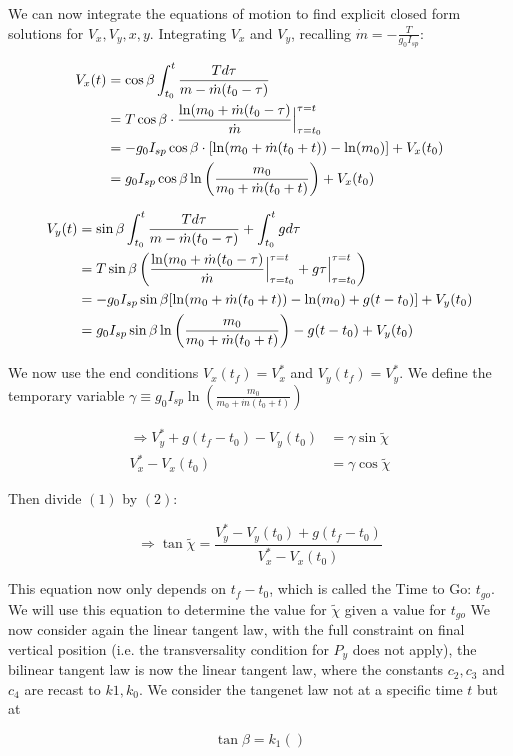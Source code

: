 \documentclass{article}
\begin{document}
We can now integrate the equations of motion to find explicit closed form solutions for $V_x, V_y, x,y$. Integrating $V_x$ and $V_y$, recalling $\dot{m} = -\frac{T}{g_0 I_{sp}}$: 

\begin{align*}
V_x(t) &= \cos{\beta}\int_{t_0}^{t} \frac{Td\tau}{m-\dot{m}(t_0 - \tau)}\notag \\
&= T\cos{\beta} \cdot \frac{\ln (m_0 + \dot{m}(t_0 - \tau)}{\dot{m}}\Big|_{\tau = t_0}^{\tau = t}\notag \\
&= -g_0I_{sp}\cos\beta \cdot [\ln(m_0 + \dot{m}(t_0 + t)) - \ln(m_0)] + V_x(t_0)\notag \\
&= g_0I_{sp}\cos\beta\ln\left(\frac{m_0}{m_0 + \dot{m}(t_0 + t)}\right) + V_x(t_0)
\end{align*}

\begin{align*}
V_y(t) &= \sin{\beta}\int_{t_0}^{t} \frac{Td\tau}{m-\dot{m}(t_0 - \tau)} + \int_{t_0}^{t} gd\tau\notag\\
&= T\sin{\beta} \left (\frac{\ln (m_0 + \dot{m}(t_0 - \tau)}{\dot{m}}\Big|_{\tau = t_0}^{\tau = t}  + g\tau\Big|_{\tau = t_0}^{\tau = t} \right )\notag \\
&= -g_0I_{sp}\sin\beta  [\ln(m_0 + \dot{m}(t_0 + t)) - \ln(m_0) + g(t - t_0)] + V_y(t_0)\notag \\
&= g_0I_{sp}\sin\beta\ln\left(\frac{m_0}{m_0 + \dot{m}(t_0 + t)}\right)  - g(t - t_0)+ V_y(t_0)
\end{align*}

We now use the end conditions $V_x(t_f) = V_x^*$ and $V_y(t_f) = V_y^*$. We define the temporary variable $\gamma \equiv g_0I_{sp}\ln\left(\frac{m_0}{m_0 + \dot{m}(t_0 + t)}\right)$

\begin{align}
\Rightarrow V_y^* + g(t_f - t_0) - V_y(t_0) &= \gamma\sin\tilde\chi \\
V_x^* - V_x(t_0) & = \gamma\cos\tilde\chi
\end{align}

Then divide $(1)$ by $(2)$: 

\begin{equation}
\Rightarrow \tan\tilde\chi = \frac{V_y^* - V_y(t_0) + g(t_f - t_0)}{V_x^* - V_x(t_0)}
\label{eq:three}
\end{equation}

This equation now only depends on $t_f - t_0$, which is called the Time to Go: $t_{go}$. We will use this equation to determine the value for $\tilde\chi$ given a value for 
$t_{go}$ \newline
We now consider again the linear tangent law, with the full constraint on final vertical position (i.e. the transversality condition for $P_y$ does not apply), the bilinear 
tangent law is now the linear tangent law, where the constants $c_2, c_3 $ and $c_4$ are recast to $k1,k_0$. We consider the tangenet law not at a specific time $t$ but at 

\begin{equation}
\tan\beta = k_1()
\end{equation}
\end{document}
